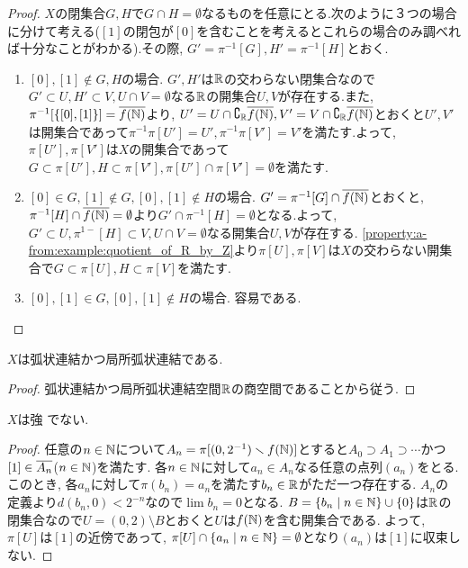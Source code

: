 \documentclass[uplatex, dvipdfmx, a4paper, 12pt, class=jsbook, crop=false]{standalone}
\begin{document}
\begin{proof}
	$ X $の閉集合$ G, H　$で$G \cap H =\emptyset $なるものを任意にとる.次のように３つの場合に分けて考える($[1]$の閉包が$[0]$を含むことを考えるとこれらの場合のみ調べれば十分なことがわかる).その際, $G' = \pi^{-1}[G], H' = \pi^{-1}[H]$とおく.
	\begin{enumerate}
		\item $[0], [1] \notin G, H$の場合.
		$G' ,H'$は$\mathbb{R}$の交わらない閉集合なので$ G' \subset U, H' \subset V, U\cap V = \emptyset$なる$ \mathbb{R} $の開集合$U ,V$が存在する.また, 
		$\pi^{-1}[\{[0], [1]\}] = \overline{f(\mathbb{N})}$より, $U' = U \cap \complement_{\mathbb{R}} \overline{f(\mathbb{N})}, V' = V \cap \complement_{\mathbb{R}} \overline{f(\mathbb{N})}$とおくと$U', V'$は開集合であって$ \pi^{-1}\pi[U'] = U', \pi^{-1}\pi[V'] = V'$を満たす.よって, $\pi[U'], \pi[V']$は$ X $の開集合であって$G \subset \pi[U'], H \subset \pi[V'], \pi[U'] \cap \pi[V'] =\emptyset$を満たす. 
		\item $ [0] \in G, [1] \notin G, [0], [1] \notin H$の場合. $G' = \pi^{-1}[G] \cap \overline{f(\mathbb{N})}$とおくと, $\pi^{-1}[H] \cap \overline{f(\mathbb{N})} =\emptyset$より$G' \cap \pi^{-1}[H] = \emptyset$となる.よって, $G' \subset U, \pi^{1-}[H] \subset V, U \cap V = \emptyset$なる開集合$U, V$が存在する. \ref{property:a-from:example:quotient_of_R_by_Z}より$\pi[U], \pi[V]$は$ X $の交わらない開集合で$ G \subset \pi[U], H \subset \pi[V]$を満たす.
		\item $[0], [1] \in G, [0], [1] \notin H$の場合. 容易である.
	\end{enumerate}

\end{proof}

\begin{property}
	$ X $は弧状連結かつ局所弧状連結である.
\end{property}

\begin{proof}
	弧状連結かつ局所弧状連結空間$ \mathbb{R} $の商空間であることから従う.
\end{proof}

\begin{property}
	$ X $は強 \Frechet でない.
\end{property}

\begin{proof}
	任意の$ n \in \mathbb{N} $について$ A_n = \pi[(0, 2^{-1}) \smallsetminus f(\mathbb{N})]$とすると$A_0 \supset A_1 \supset \cdots$かつ$ [1] \in \overline{A_n}$($ n \in \mathbb{N}$)を満たす. 各$n \in \mathbb{N} $に対して$ a_n \in A_n $なる任意の点列$(a_n)$をとる.このとき, 各$a_n$に対して$\pi(b_n) = a_n$を満たす$b_n \in \mathbb{R}$がただ一つ存在する. $ A_n $の定義より$d(b_n, 0) < 2^{-n} $なので$\lim b_n = 0$となる. $B = \{b_n \mid n\in \mathbb{N}\} \cup \{0\}$は$\mathbb{R}$の閉集合なので$ U = (0,2) \setminus B$とおくと$U$は$f(\mathbb{N})$を含む開集合である. よって, $\pi[U]$は$[1]$の近傍であって, $ \pi[U] \cap \{a_n \mid n\in \mathbb{N}\} = \emptyset$となり$(a_n)$は$[1]$に収束しない.
\end{proof}
\end{document}
